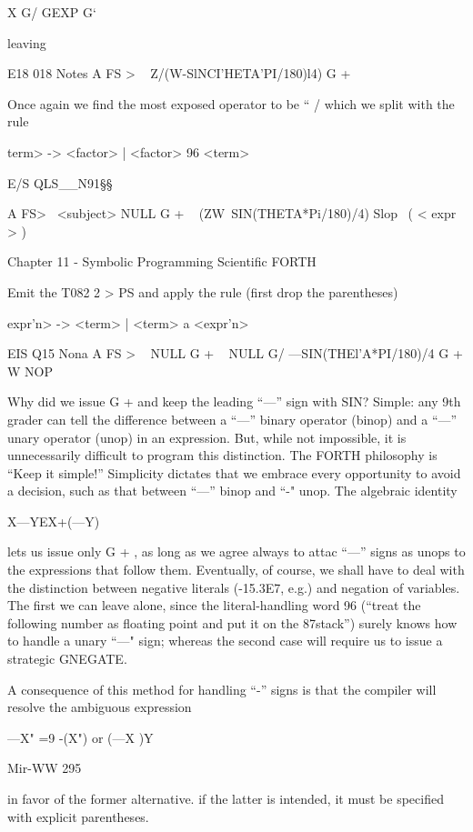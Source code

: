 X G/ GEXP G‘

 

leaving

E18 018 Notes
A FS > \ < subject >
Z/(W-SlNCI’HETA'PI/180)l4) G + \ < term >

Once again we find the most exposed operator to be “ / which
we split with the rule

\<term> -> <factor> | <factor> 96 <term>

 

E/S QLS__N91§§

A FS> \ <subject>
NULL G + \ < term >
(ZW~SIN(THETA*Pi/180)/4) Slop \ ( < expr > )

Chapter 11 - Symbolic Programming Scientific FORTH

Emit the T082
2 > PS
and apply the rule (first drop the parentheses)

\<expr'n> -> <term> | <term> a <expr'n>

 

EIS Q15 Nona
A FS > \ < subject >
NULL G + \ < term >
NULL G/
—SIN(THEl'A*PI/180)/4 G +
W NOP

Why did we issue G + and keep the leading “—” sign with SIN?
Simple: any 9th grader can tell the difference between a “—”
binary operator (binop) and a “—” unary operator (unop) in an
expression. But, while not impossible, it is unnecessarily difficult
to program this distinction. The FORTH philosophy is “Keep it
simple!” Simplicity dictates that we embrace every opportunity
to avoid a decision, such as that between “—” binop and “-" unop.
The algebraic identity

X—YEX+(—Y)

lets us issue only G + , as long as we agree always to attac “—”
signs as unops to the expressions that follow them. Eventually,
of course, we shall have to deal with the distinction between
negative literals (-15.3E7, e.g.) and negation of variables. The
first we can leave alone, since the literal-handling word 96 (“treat
the following number as ﬂoating point and put it on the 87stack”)
surely knows how to handle a unary “—" sign; whereas the second
case will require us to issue a strategic GNEGATE.

A consequence of this method for handling “-” signs is that the
compiler will resolve the ambiguous expression

—X" =9 -(X") or (—X )Y

Mir-WW 295

in favor of the former alternative. if the latter is intended, it must
be specified with explicit parentheses.

